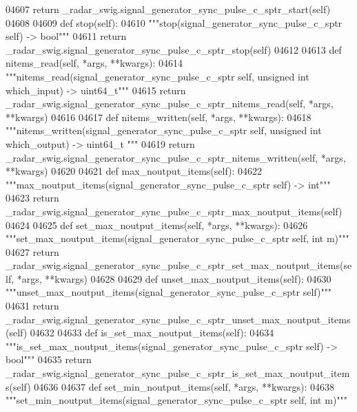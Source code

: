 \begin{DoxyCode}
{{{{{{{{{{{{{{{{04607         \textcolor{keywordflow}{return} \_radar\_swig.signal\_generator\_sync\_pulse\_c\_sptr\_start(self)
04608 
04609     \textcolor{keyword}{def }stop(self):
04610         \textcolor{stringliteral}{"""stop(signal\_generator\_sync\_pulse\_c\_sptr self) -> bool"""}
04611         \textcolor{keywordflow}{return} \_radar\_swig.signal\_generator\_sync\_pulse\_c\_sptr\_stop(self)
04612 
04613     \textcolor{keyword}{def }nitems_read(self, *args, **kwargs):
04614         \textcolor{stringliteral}{"""nitems\_read(signal\_generator\_sync\_pulse\_c\_sptr self, unsigned int which\_input) -> uint64\_t"""}
04615         \textcolor{keywordflow}{return} \_radar\_swig.signal\_generator\_sync\_pulse\_c\_sptr\_nitems\_read(self, *args, **kwargs)
04616 
04617     \textcolor{keyword}{def }nitems_written(self, *args, **kwargs):
04618         \textcolor{stringliteral}{"""nitems\_written(signal\_generator\_sync\_pulse\_c\_sptr self, unsigned int which\_output) -> uint64\_t
      """}
04619         \textcolor{keywordflow}{return} \_radar\_swig.signal\_generator\_sync\_pulse\_c\_sptr\_nitems\_written(self, *args, **kwargs)
04620 
04621     \textcolor{keyword}{def }max_noutput_items(self):
04622         \textcolor{stringliteral}{"""max\_noutput\_items(signal\_generator\_sync\_pulse\_c\_sptr self) -> int"""}
04623         \textcolor{keywordflow}{return} \_radar\_swig.signal\_generator\_sync\_pulse\_c\_sptr\_max\_noutput\_items(self)
04624 
04625     \textcolor{keyword}{def }set_max_noutput_items(self, *args, **kwargs):
04626         \textcolor{stringliteral}{"""set\_max\_noutput\_items(signal\_generator\_sync\_pulse\_c\_sptr self, int m)"""}
04627         \textcolor{keywordflow}{return} \_radar\_swig.signal\_generator\_sync\_pulse\_c\_sptr\_set\_max\_noutput\_items(self, *args, **kwargs)
04628 
04629     \textcolor{keyword}{def }unset_max_noutput_items(self):
04630         \textcolor{stringliteral}{"""unset\_max\_noutput\_items(signal\_generator\_sync\_pulse\_c\_sptr self)"""}
04631         \textcolor{keywordflow}{return} \_radar\_swig.signal\_generator\_sync\_pulse\_c\_sptr\_unset\_max\_noutput\_items(self)
04632 
04633     \textcolor{keyword}{def }is_set_max_noutput_items(self):
04634         \textcolor{stringliteral}{"""is\_set\_max\_noutput\_items(signal\_generator\_sync\_pulse\_c\_sptr self) -> bool"""}
04635         \textcolor{keywordflow}{return} \_radar\_swig.signal\_generator\_sync\_pulse\_c\_sptr\_is\_set\_max\_noutput\_items(self)
04636 
04637     \textcolor{keyword}{def }set_min_noutput_items(self, *args, **kwargs):
04638         \textcolor{stringliteral}{"""set\_min\_noutput\_items(signal\_generator\_sync\_pulse\_c\_sptr self, int m)"""}
}}}}}}}}}}}}}}}}
\end{DoxyCode}
